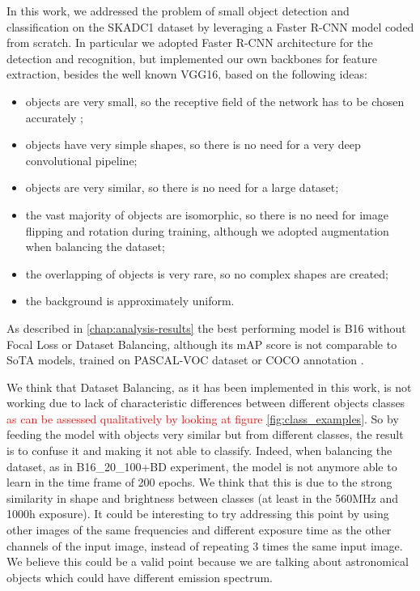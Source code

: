 \documentclass[a4paper,10pt]{report}
\begin{document}
In this work, we addressed the problem of small object detection and classification on the SKADC1 dataset by leveraging a Faster R-CNN model coded from scratch.
In particular we adopted Faster R-CNN architecture for the detection and recognition, but implemented our own backbones for feature extraction, besides the well known VGG16, based on the following ideas:
\begin{itemize}
\item objects are very small, so the receptive field of the network has to be chosen accurately \cite{effective-rf};
\item objects have very simple shapes, so there is no need for a very deep convolutional pipeline;
\item objects are very similar, so there is no need for a large dataset;
\item the vast majority of objects are isomorphic, so there is no need for image flipping and rotation during training, although we adopted augmentation when balancing the dataset;
\item the overlapping of objects is very rare, so no complex shapes are created;
\item the background is approximately uniform.
\end{itemize}

As described in \ref{chap:analysis-results} the best performing model is B16 without Focal Loss or Dataset Balancing, 
although its mAP score is not comparable to SoTA models, trained on PASCAL-VOC dataset or COCO annotation \cite{faster-rcnn}.

We think that Dataset Balancing, as it has been implemented in this work, is not working due to lack of characteristic differences between different objects classes 
\textcolor{red}{ as can be assessed qualitatively by looking at figure \ref{fig:class_examples}}. 
So by feeding the model with objects very similar but from different classes, the result is to confuse it and making it not able to classify.
Indeed, when balancing the dataset, as in B16\_20\_100+BD experiment, the model is not anymore able to learn in the time frame of 200 epochs. 
We think that this is due to the strong similarity in shape and brightness between classes (at least in the 560MHz and 1000h exposure). 
It could be interesting to try addressing this point by using other images of the same frequencies and different exposure time as the other channels of the input image, instead of repeating 3 times the same input image. 
We believe this could be a valid point because we are talking about astronomical objects which could have different emission spectrum.
\end{document}
